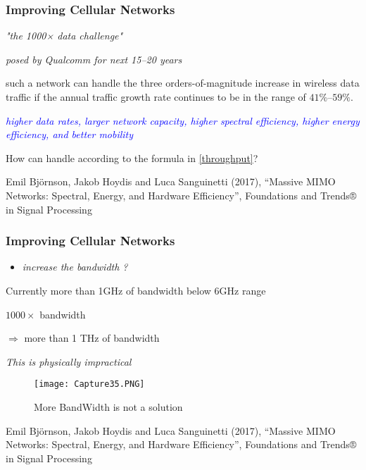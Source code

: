 \documentclass{beamer}
\begin{document}
\begin{frame}[t,fragile=singleslide]\frametitle{Improving Cellular Networks}
\centerline{\textit{"the 1000× data challenge"}}
 
\centerline{\textit{posed by Qualcomm for next 15–20 years}}

\vspace{0.7cm}

such a network can handle the three orders-of-magnitude increase in wireless data traffic if the annual traffic growth rate continues to be in the range of $41\% – 59\%$.

\vspace{0.7cm}

\textcolor{blue}{\textit{higher data rates, larger network capacity, higher spectral efficiency, higher energy efficiency, and better mobility}}
\vspace{0.65cm}

How can handle according to the formula in \eqref{throughput}?

\vspace{1.2cm}

\tiny Emil Björnson, Jakob Hoydis and Luca Sanguinetti (2017), “Massive MIMO Networks: Spectral, Energy, and Hardware Efficiency”, Foundations and Trends® in Signal Processing

\end{frame}




\begin{frame}[fragile=singleslide]\frametitle{Improving Cellular Networks}
\begin{itemize}
\item \textit{increase the bandwidth ?}

\end{itemize}
Currently more than 1GHz of bandwidth below 6GHz range


\centerline{$1000\times$ bandwidth}


\centerline{$\Rightarrow$ more than 1 THz of bandwidth }

            
\centerline{      \emph{This is physically impractical}}

\begin{figure}
  \texttt{[image: Capture35.PNG]}
\caption{More BandWidth is not a solution} 
\end{figure}



\tiny Emil Björnson, Jakob Hoydis and Luca Sanguinetti (2017), “Massive MIMO Networks: Spectral, Energy, and Hardware Efficiency”, Foundations and Trends® in Signal Processing

\end{frame}
\end{document}
